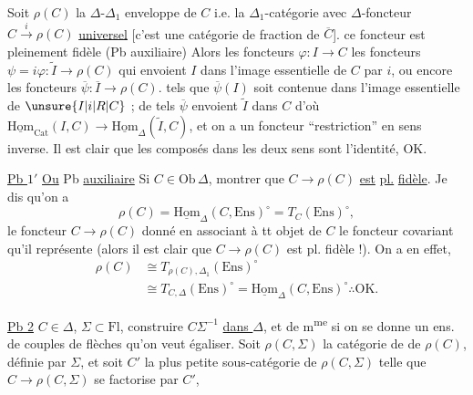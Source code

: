 Soit $\rho(C)$ la $\Delta$-$\Delta_1$ enveloppe de $C$ i.e. la $\Delta_1$-catégorie avec $\Delta$-foncteur $C\xrightarrow{i}\rho(C)$ \uline{universel} [c'est une catégorie  de fraction de $\overline C$].    ce foncteur est pleinement fidèle (Pb auxiliaire)  Alors les foncteurs $\varphi:I\longrightarrow C$   les foncteurs $\psi=i\varphi:\widetilde I\longrightarrow\rho(C)$ qui envoient $I$ dans l'image essentielle de $C$ par $i$, ou encore les foncteurs $\overline\psi:\overline I\longrightarrow\rho(C)$. tels que $\overline\psi(I)$ soit contenue dans l'image essentielle de $\unsure{I|i|R|C}$ ; de tels $\overline\psi$ envoient $\widetilde I$ dans $C$ d'où $\underline{\mathrm{Hom}}_{\mathrm{Cat}}(I,C)\longrightarrow\underline{\mathrm{Hom}}_{\Delta}(\widetilde I,C)$, et on a un foncteur ``restriction'' en sens inverse. Il est clair que les composés dans les deux sens sont l'identité, OK.

\uline{Pb $1'$} \uline{Ou} Pb \uline{auxiliaire} Si $C\in\mathrm{Ob}\,\Delta$, montrer que $C\longrightarrow\rho(C)$ \uline{est} \uline{pl.} \uline{fidèle}. Je dis qu'on a
\[
\rho(C)=\underline{\mathrm{Hom}}_\Delta(C,\mathrm{Ens})^\circ=T_C(\mathrm{Ens})^\circ,
\]
le foncteur $C\longrightarrow\rho(C)$  donné  en associant à tt objet de $C$ le foncteur covariant qu'il représente (alors il est clair que $C\longrightarrow\rho(C)$ est pl. fidèle !). On a en effet, 
\[
\begin{aligned}
\rho(C)&\cong T_{\rho(C),\Delta_1}(\mathrm{Ens})^\circ\\
&\cong T_{C,\Delta}(\mathrm{Ens})^\circ=\underline{\mathrm{Hom}}_\Delta(C,\mathrm{Ens})^\circ\mathrel{\therefore}\mathrm{OK}.
\end{aligned}
\]

\uline{Pb 2} $C\in\Delta$, $\Sigma\subset\mathrm{Fl}$, construire $C\Sigma^{-1}$ \uline{dans $\Delta$}, et de m\textsuperscript{me} si on se donne un ens. de couples de flèches qu'on veut égaliser.  Soit $\rho(C,\Sigma)$ la catégorie de  de $\rho(C)$, définie par $\Sigma$, et soit $C'$ la plus petite sous-\inserted{$\Delta$-}catégorie  de $\rho(C,\Sigma)$  telle que $C\longrightarrow\rho(C,\Sigma)$ se factorise par $C'$, 


